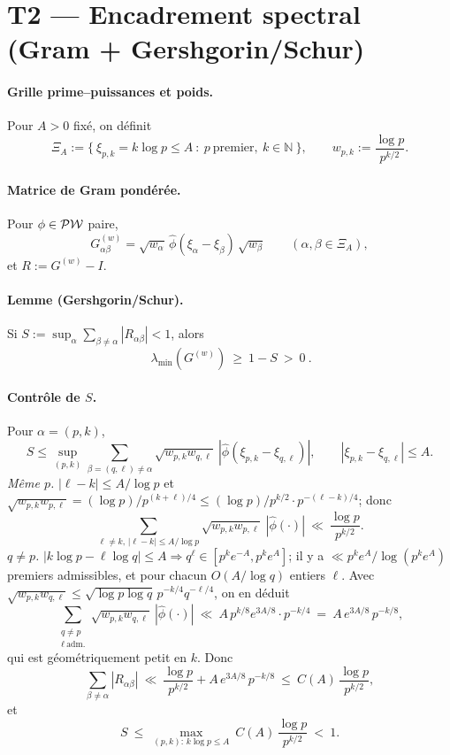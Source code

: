 \documentclass[11pt,a4paper]{proofarticle}
\begin{document}
\section*{T2 — Encadrement spectral (Gram + Gershgorin/Schur)}
\paragraph{Grille prime–puissances et poids.}
Pour $A>0$ fixé, on définit
\[
\Xi_A:=\{\ \xi_{p,k}=k\log p\le A\ :\ p\ \text{premier},\ k\in\mathbb{N}\ \},\qquad
w_{p,k}:=\frac{\log p}{p^{k/2}}.
\]
\paragraph{Matrice de Gram pondérée.}
Pour $\phi\in\mathcal{PW}$ paire,
\[
G^{(w)}_{\alpha\beta}=\sqrt{w_\alpha}\,\widehat{\phi}(\xi_\alpha-\xi_\beta)\,\sqrt{w_\beta}\qquad(\alpha,\beta\in\Xi_A),
\]
et $R:=G^{(w)}-I$.
\paragraph{Lemme (Gershgorin/Schur).}
Si $S:=\sup_{\alpha}\sum_{\beta\ne\alpha}|R_{\alpha\beta}|<1$, alors
\[
\boxed{\ \lambda_{\min}(G^{(w)})\ \ge\ 1-S\ >\ 0\ }.
\]
\paragraph{Contrôle de $S$.}
Pour $\alpha=(p,k)$,
\[
S\le \sup_{(p,k)} \sum_{\beta=(q,\ell)\neq\alpha} \sqrt{w_{p,k}w_{q,\ell}}\ |\widehat{\phi}(\xi_{p,k}-\xi_{q,\ell})|, \qquad
|\xi_{p,k}-\xi_{q,\ell}|\le A.
\]
\emph{Même $p$.} $|\ell-k|\le A/\log p$ et
$\sqrt{w_{p,k}w_{p,\ell}}=(\log p)/p^{(k+\ell)/4} \le (\log p)/p^{k/2}\cdot p^{-(\ell-k)/4}$; donc
\[
\sum_{\ell\ne k,\,|\ell-k|\le A/\log p} \sqrt{w_{p,k}w_{p,\ell}}\ |\widehat{\phi}(\cdot)|
\ \ll\ \frac{\log p}{p^{k/2}}.
\]
\emph{$q\ne p$.} $|k\log p-\ell\log q|\le A \Rightarrow q^\ell\in[p^k e^{-A}, p^k e^{A}]$;
il y a $\ll p^k e^A/\log(p^k e^A)$ premiers admissibles, et pour chacun $O(A/\log q)$ entiers $\ell$.
Avec $\sqrt{w_{p,k}w_{q,\ell}}\le \sqrt{\log p\log q}\,p^{-k/4}q^{-\ell/4}$, on en déduit
\[
\sum_{\substack{q\ne p\\ \ell\ \text{adm.}}} \sqrt{w_{p,k}w_{q,\ell}}\ |\widehat{\phi}(\cdot)|
\ \ll\ A\,p^{k/8}e^{3A/8}\cdot p^{-k/4}
\ =\ A\,e^{3A/8}\,p^{-k/8},
\]
qui est géométriquement petit en $k$. Donc
\[
\sum_{\beta\ne\alpha} |R_{\alpha\beta}| \ \ll\ \frac{\log p}{p^{k/2}} + A\,e^{3A/8}\,p^{-k/8}
\ \le\ C(A)\,\frac{\log p}{p^{k/2}},
\]
et
\[
S\ \le\ \max_{(p,k):\,k\log p\le A}\ C(A)\,\frac{\log p}{p^{k/2}} \ <\ 1.
\]
\end{document}
